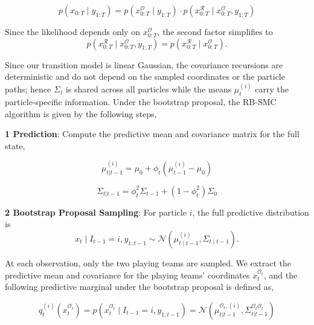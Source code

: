 \begin{equation}
    p(x_{0:T} \mid y_{1:T}) = p(x_{0:T}^{\mathcal{O}} \mid y_{1:T}) \cdot p(x_{0:T}^{\mathcal{R}} \mid x_{0:T}^{\mathcal{O}}, y_{1:T})
\end{equation}

Since the likelihood depends only on $x_{0:T}^{\mathcal{O}}$, the second factor simplifies to
\begin{equation}
    p(x_{0:T}^{\mathcal{R}} \mid x_{0:T}^{\mathcal{O}}, y_{1:T}) = p(x_{0:T}^{\mathcal{R}} \mid x_{0:T}^{\mathcal{O}}).
\end{equation}

Since our transition model is linear Gaussian, the covariance recursions are deterministic and do not depend on the sampled coordinates or the particle paths; hence $\Sigma_t$ is shared across all particles while the means $\mu_t^{(i)}$ carry the particle-specific information. Under the bootstrap proposal, the RB-SMC algorithm is given by the following steps,

\textbf{1 Prediction}: Compute the predictive mean and covariance matrix for the full state,

\begin{equation}
    \mu_{t|t-1}^{(i)} = \mu_0 + \phi_t (\mu_{t-1}^{(i)} - \mu_0) \nonumber
\end{equation}

\begin{equation}
    \Sigma_{t|t-1} = \phi_t^2 \Sigma_{t-1} + (1 - \phi_t^2) \Sigma_0 \nonumber
\end{equation}

\textbf{2 Bootstrap Proposal Sampling}: For particle $i$, the full predictive distribution is
\begin{equation}
x_t \mid I_{t-1}=i,y_{1:t-1} \sim \mathcal{N}\left(\mu_{t\mid t-1}^{(i)}, \Sigma_{t\mid t-1} \right). \end{equation}

At each observation, only the two playing teams are sampled. We extract the predictive mean and covariance for the playing teams' coordinates $x_t^{\mathcal{O}_t}$, and the following predictive marginal under the bootstrap proposal is defined as,

\begin{equation}
    q_t^{(i)}(x_t^{\mathcal{O}_t}) = p(x_t^{\mathcal{O}_t} \mid I_{t-1} = i, y_{1:t-1}) = \mathcal{N}(\mu_{t|t-1}^{\mathcal{O}_t,(i)}, \Sigma_{t|t-1}^{\mathcal{O}_t\mathcal{O}_t}) \nonumber
\end{equation}

